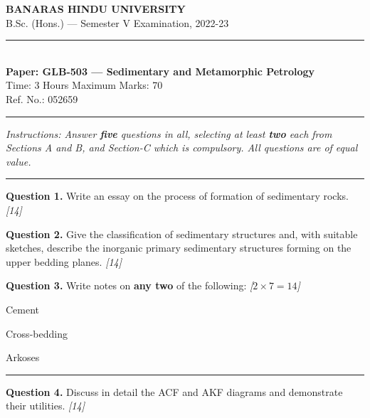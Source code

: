\documentclass[11pt,a4paper]{article}
\newcommand{\pts}[1]{\hfill   \textit{[#1]}}
\begin{document}
\begin{center}
  {\large\bfseries BANARAS HINDU UNIVERSITY}\\[2pt]
  {\normalsize B.Sc. (Hons.) --- Semester V Examination, 2022-23}\\[6pt]
  \rule{0.8\linewidth}{0.5pt}\\[6pt]
  {\large\bfseries Paper: GLB-503 --- Sedimentary and Metamorphic Petrology}\\[4pt]
  {\normalsize Time: 3 Hours \hfill Maximum Marks: 70}\\[2pt]
  {\small Ref. No.: 052659}
\end{center}
\rule{\linewidth}{0.4pt}
\smallskip



\noindent   \textit{Instructions: Answer   \textbf{five} questions in all, selecting at least   \textbf{two} each from Sections A and B, and Section-C which is compulsory. All questions are of equal value.}
\bigskip

\bigskip


\rule{\linewidth}{0.4pt}\smallskip




\noindent   \textbf{Question 1.} Write an essay on the process of formation of sedimentary rocks. \pts{14}

\medskip


\noindent   \textbf{Question 2.} Give the classification of sedimentary structures and, with suitable sketches, describe the inorganic primary sedimentary structures forming on the upper bedding planes. \pts{14}

\medskip


\noindent   \textbf{Question 3.} Write notes on   \textbf{any two} of the following: \pts{$2  \times 7 = 14$}

\begin{parts}
  \item Cement
  \item Cross-bedding
  \item Arkoses
\end{parts}

\bigskip


\rule{\linewidth}{0.4pt}\smallskip




\noindent   \textbf{Question 4.} Discuss in detail the ACF and AKF diagrams and demonstrate their utilities. \pts{14}

\medskip
\end{document}
